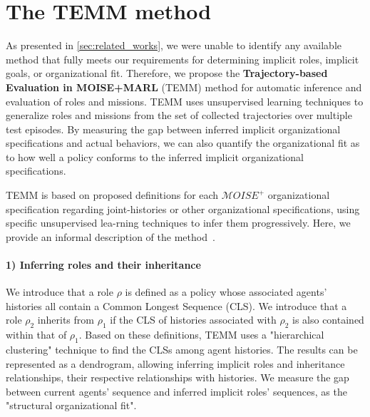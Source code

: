 \documentclass[sigconf]{aamas}
\begin{document}
\section{The TEMM method}
\label{sec:TEMM_algorithm}

As presented in \autoref{sec:related_works}, we were unable to identify any available method that fully meets our requirements for determining implicit roles, implicit goals, or organizational fit. Therefore, we propose the \textbf{Trajectory-based Evaluation in MOISE+MARL} (TEMM) method for automatic inference and evaluation of roles and missions.
%
TEMM uses unsupervised learning techniques to generalize roles and missions from the set of collected trajectories over multiple test episodes. By measuring the gap between inferred implicit organizational specifications and actual behaviors, we can also quantify the organizational fit as to how well a policy conforms to the inferred implicit organizational specifications.

TEMM is based on proposed definitions for each $\mathcal{M}OISE^+$ organizational specification regarding joint-histories or other organizational specifications, using specific unsupervised lea-rning techniques to infer them progressively. Here, we provide an informal description of the method~\hyperref[fn:github]{\footnotemark[1]}.
%

\paragraph{\textbf{1) Inferring roles and their inheritance}}

We introduce that a role $\rho$ is defined as a policy whose associated agents' histories all contain a Common Longest Sequence (CLS). We introduce that a role $\rho_2$ inherits from $\rho_1$ if the CLS of histories associated with $\rho_2$ is also contained within that of $\rho_1$.
Based on these definitions, TEMM uses a "hierarchical clustering" technique to find the CLSs among agent histories. The results can be represented as a dendrogram, allowing inferring implicit roles and inheritance relationships, their respective relationships with histories.
We measure the gap between current agents' sequence and inferred implicit roles' sequences, as the "structural organizational fit".
\end{document}
